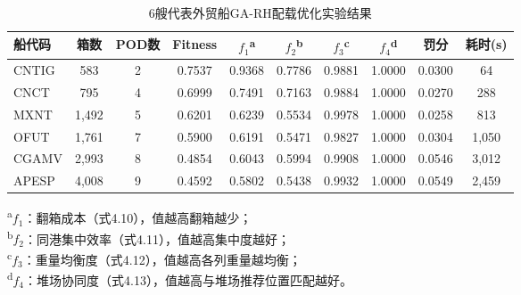 \begin{table}[htbp]
\centering
\caption{6艘代表外贸船GA-RH配载优化实验结果}
\label{tab:6ship_ga_rh}
\small
\begin{tabular}{lccccccccc}
\toprule
\textbf{船代码} & \textbf{箱数} & \textbf{POD数} & \textbf{Fitness} & $f_1$\textsuperscript{a} & $f_2$\textsuperscript{b} & $f_3$\textsuperscript{c} & $f_4$\textsuperscript{d} & \textbf{罚分} & \textbf{耗时(s)} \\
\midrule
CNTIG & 583 & 2 & 0.7537 & 0.9368 & 0.7786 & 0.9881 & 1.0000 & 0.0300 & 64 \\
CNCT  & 795 & 4 & 0.6999 & 0.7491 & 0.7163 & 0.9884 & 1.0000 & 0.0270 & 288 \\
MXNT  & 1,492 & 5 & 0.6201 & 0.6239 & 0.5534 & 0.9978 & 1.0000 & 0.0258 & 813 \\
OFUT  & 1,761 & 7 & 0.5900 & 0.6191 & 0.5471 & 0.9827 & 1.0000 & 0.0304 & 1,050 \\
CGAMV & 2,993 & 8 & 0.4854 & 0.6043 & 0.5994 & 0.9908 & 1.0000 & 0.0546 & 3,012 \\
APESP & 4,008 & 9 & 0.4592 & 0.5802 & 0.5438 & 0.9932 & 1.0000 & 0.0549 & 2,459 \\
\bottomrule
\end{tabular}
\vspace{2mm}
\parbox{0.9\textwidth}{\footnotesize
\textsuperscript{a}$f_1$：翻箱成本（式4.10），值越高翻箱越少；\\
\textsuperscript{b}$f_2$：同港集中效率（式4.11），值越高集中度越好；\\
\textsuperscript{c}$f_3$：重量均衡度（式4.12），值越高各列重量越均衡；\\
\textsuperscript{d}$f_4$：堆场协同度（式4.13），值越高与堆场推荐位置匹配越好。
}
\end{table}
